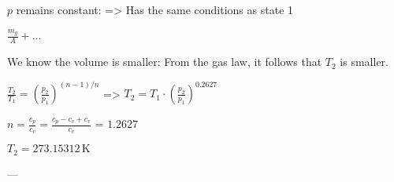 \( p \) remains constant:  
=> Has the same conditions as state 1  

\( \frac{m_g}{A} + \dots \)  

We know the volume is smaller: From the gas law, it follows that \( T_2 \) is smaller.  

\( \frac{T_2}{T_1} = \left(\frac{p_2}{p_1}\right)^{(n-1)/n} \)  
=> \( T_2 = T_1 \cdot \left(\frac{p_2}{p_1}\right)^{0.2627} \)  

\( n = \frac{c_p}{c_v} = \frac{c_p - c_v + c_v}{c_v} \)  
= \( 1.2627 \)  

\( T_2 = 273.15312 \, \text{K} \)  

---